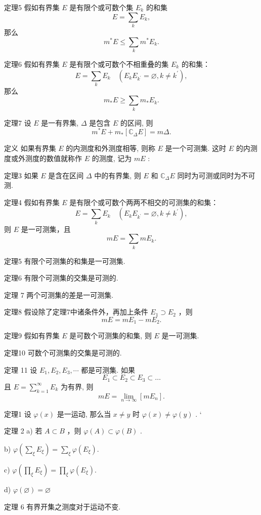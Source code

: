 \documentclass[]{article}
\begin{document}
定理5 假如有界集 $E$ 是有限个或可数个集 $E_{k}$ 的和集 $$
E = \sum_ {k} E _ {k},
$$那么$$
m ^ {*} E \leqslant \sum_ {k} m ^ {*} E _ {k}.
$$

定理6 假如有界集 $E$ 是有限个或可数个不相重叠的集 $E_{k}$ 的和集：$$
E = \sum_ {k} E _ {k} \quad (E _ {k} E _ {k ^ {\prime}} = \varnothing , k \neq k ^ {\prime}),
$$ 那么 $$
m _ {*} E \geqslant \sum_ {k} m _ {*} E _ {k}.
$$

定理7 设 $E$ 是一有界集, $\Delta$ 是包含 $E$ 的区间, 则  $$
m ^ {*} E + m _ {*} [ \mathbb {C} _ {\Delta} E ] = m \Delta .
$$

定义 如果有界集 $E$ 的内测度和外测度相等, 则称 $E$ 是一个可测集. 这时 $E$ 的内测度或外测度的数值就称作 $E$ 的测度, 记为 $mE$ : 

定理3 如果 $E$ 是含在区间 $\Delta$ 中的有界集, 则 $E$ 和 $\mathbb{C}_{\Delta}E$ 同时为可测或同时为不可测. 

定理4 假如有界集 $E$ 是有限个或可数个两两不相交的可测集的和集：$$
E = \sum_ {k} E _ {k} \quad (E _ {k} E _ {k ^ {\prime}} = \varnothing , k \neq k ^ {\prime}),
$$ 则 $E$ 是一可测集，且$$
m E = \sum_ {k} m E _ {k}.
$$

定理5 有限个可测集的和集是一可测集. 

定理6 有限个可测集的交集是可测的. 

定理 7 两个可测集的差是一可测集. 

定理8 假设除了定理7中诸条件外，再加上条件 $E_{1} \supset E_{2}$ ，则 $$
m E = m E _ {1} - m E _ {2}.
$$

定理9 假如有界集 $E$ 是可数个可测集的和集, 则 $E$ 是一可测集. 

定理10 可数个可测集的交集是可测的. 

定理 11 设 $E_{1}, E_{2}, E_{3}, \cdots$ 都是可测集. 如果 $$
E _ {1} \subset E _ {2} \subset E _ {3} \subset \dots
$$ 且 $E = \sum_{k=1}^{\infty} E_k$ 为有界, 则$$
m E = \lim _ {n \rightarrow \infty} [ m E _ {n} ].
$$

定理1 设 $\varphi(x)$ 是一运动, 那么当 $x \neq y$ 时 $\varphi(x) \neq \varphi(y)$ . ‘

定理 2 a) 若 $A \subset B$ ，则 $\varphi(A) \subset \varphi(B)$ .    

b) $\varphi\left(\sum_{\xi}E_{\xi}\right)=\sum_{\xi}\varphi(E_{\xi}).$ 

c) $\varphi\left(\prod_{\xi}E_{\xi}\right)=\prod_{\xi}\varphi(E_{\xi}).$ 

d) $\varphi (\varnothing) = \varnothing$ 

定理 6 有界开集之测度对于运动不变. 
\end{document}
